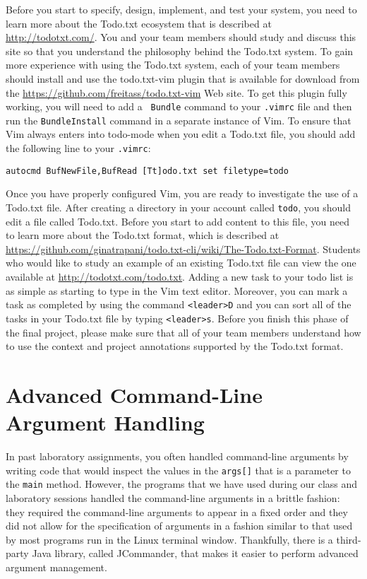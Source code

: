 Before you start to specify, design, implement, and test your system, you need to learn more about the Todo.txt
ecosystem that is described at \url{http://todotxt.com/}. You and your team members should study and discuss this site
so that you understand the philosophy behind the Todo.txt system. To gain more experience with using the Todo.txt
system, each of your team members should install and use the todo.txt-vim plugin that is available for download from the
\url{https://github.com/freitass/todo.txt-vim} Web site. To get this plugin fully working, you will need to add a {\tt
  Bundle} command to your {\tt .vimrc} file and then run the {\tt BundleInstall} command in a separate instance of Vim.
To ensure that Vim always enters into todo-mode when you edit a Todo.txt file, you should add the following line to your
{\tt .vimrc}:

{\tt autocmd BufNewFile,BufRead [Tt]odo.txt set filetype=todo}

Once you have properly configured Vim, you are ready to investigate the use of a Todo.txt file. After creating a
directory in your account called {\tt todo}, you should edit a file called Todo.txt.  Before you start to add content to
this file, you need to learn more about the Todo.txt format, which is described at
\url{https://github.com/ginatrapani/todo.txt-cli/wiki/The-Todo.txt-Format}. Students who would like to study an example
of an existing Todo.txt file can view the one available at \url{http://todotxt.com/todo.txt}. Adding a new task to your
todo list is as simple as starting to type in the Vim text editor.  Moreover, you can mark a task as completed by using
the command {\tt <leader>D} and you can sort all of the tasks in your Todo.txt file by typing {\tt <leader>s}. Before
you finish this phase of the final project, please make sure that all of your team members understand how to use the
context and project annotations supported by the Todo.txt format.

\section*{Advanced Command-Line Argument Handling}

In past laboratory assignments, you often handled command-line arguments by writing code that would inspect the values
in the {\tt args[]} that is a parameter to the {\tt main} method.  However, the programs that we have used during our
class and laboratory sessions handled the command-line arguments in a brittle fashion: they required the command-line
arguments to appear in a fixed order and they did not allow for the specification of arguments in a fashion similar to
that used by most programs run in the Linux terminal window. Thankfully, there is a third-party Java library, called
JCommander, that makes it easier to perform advanced argument management. 

